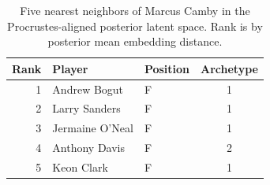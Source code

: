 \begin{table}[htbp]
  \centering\small
  \begin{tabular}{rllc}
    \toprule
    Rank & Player & Position & Archetype \\
    \midrule
    1 & Andrew Bogut & F & 1 \\
    2 & Larry Sanders & F & 1 \\
    3 & Jermaine O'Neal & F & 1 \\
    4 & Anthony Davis & F & 2 \\
    5 & Keon Clark & F & 1 \\
    \bottomrule
  \end{tabular}
  \caption{Five nearest neighbors of Marcus Camby in the Procrustes-aligned posterior latent space. Rank is by posterior mean embedding distance.}
  \label{tab:Marcus_Camby_neighbors}
\end{table}

